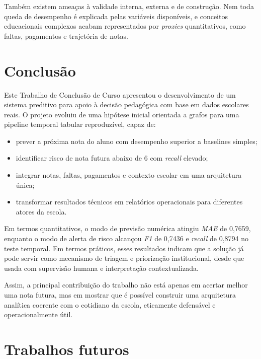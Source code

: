 Tamb\'em existem amea\c{c}as \`a validade interna, externa e de constru\c{c}\~ao. Nem toda queda de desempenho \'e explicada pelas vari\'aveis dispon\'iveis, e conceitos educacionais complexos acabam representados por \textit{proxies} quantitativos, como faltas, pagamentos e trajet\'oria de notas.

\section{Conclus\~ao}
\label{sec:conclusao-final}

Este Trabalho de Conclus\~ao de Curso apresentou o desenvolvimento de um sistema preditivo para apoio \`a decis\~ao pedag\'ogica com base em dados escolares reais. O projeto evoluiu de uma hip\'otese inicial orientada a grafos para uma pipeline temporal tabular reproduz\'ivel, capaz de:

\begin{itemize}
    \item prever a pr\'oxima nota do aluno com desempenho superior a baselines simples;
    \item identificar risco de nota futura abaixo de 6 com \textit{recall} elevado;
    \item integrar notas, faltas, pagamentos e contexto escolar em uma arquitetura \'unica;
    \item transformar resultados t\'ecnicos em relat\'orios operacionais para diferentes atores da escola.
\end{itemize}

Em termos quantitativos, o modo de previs\~ao num\'erica atingiu \textit{MAE} de 0,7659, enquanto o modo de alerta de risco alcan\c{c}ou \textit{F1} de 0,7436 e \textit{recall} de 0,8794 no teste temporal. Em termos pr\'aticos, esses resultados indicam que a solu\c{c}\~ao j\'a pode servir como mecanismo de triagem e prioriza\c{c}\~ao institucional, desde que usada com supervis\~ao humana e interpreta\c{c}\~ao contextualizada.

Assim, a principal contribui\c{c}\~ao do trabalho n\~ao est\'a apenas em acertar melhor uma nota futura, mas em mostrar que \'e poss\'ivel construir uma arquitetura anal\'itica coerente com o cotidiano da escola, eticamente defens\'avel e operacionalmente \'util.

\section{Trabalhos futuros}
\label{sec:futuro}

